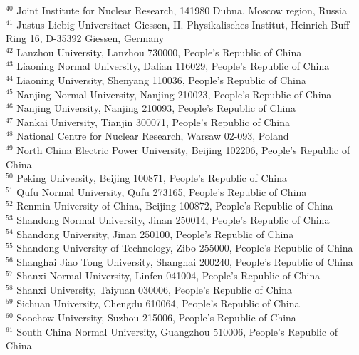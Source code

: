 \documentclass[aps,amsmath,amssymb,reprint]{revtex4-2}
\begin{document}
\begin{widetext}
\begin{center}
{$^{40}$ Joint Institute for Nuclear Research, 141980 Dubna, Moscow region, Russia\\
$^{41}$ Justus-Liebig-Universitaet Giessen, II. Physikalisches Institut, Heinrich-Buff-Ring 16, D-35392 Giessen, Germany\\
$^{42}$ Lanzhou University, Lanzhou 730000, People's Republic of China\\
$^{43}$ Liaoning Normal University, Dalian 116029, People's Republic of China\\
$^{44}$ Liaoning University, Shenyang 110036, People's Republic of China\\
$^{45}$ Nanjing Normal University, Nanjing 210023, People's Republic of China\\
$^{46}$ Nanjing University, Nanjing 210093, People's Republic of China\\
$^{47}$ Nankai University, Tianjin 300071, People's Republic of China\\
$^{48}$ National Centre for Nuclear Research, Warsaw 02-093, Poland\\
$^{49}$ North China Electric Power University, Beijing 102206, People's Republic of China\\
$^{50}$ Peking University, Beijing 100871, People's Republic of China\\
$^{51}$ Qufu Normal University, Qufu 273165, People's Republic of China\\
$^{52}$ Renmin University of China, Beijing 100872, People's Republic of China\\
$^{53}$ Shandong Normal University, Jinan 250014, People's Republic of China\\
$^{54}$ Shandong University, Jinan 250100, People's Republic of China\\
$^{55}$ Shandong University of Technology, Zibo 255000, People's Republic of China\\
$^{56}$ Shanghai Jiao Tong University, Shanghai 200240, People's Republic of China\\
$^{57}$ Shanxi Normal University, Linfen 041004, People's Republic of China\\
$^{58}$ Shanxi University, Taiyuan 030006, People's Republic of China\\
$^{59}$ Sichuan University, Chengdu 610064, People's Republic of China\\
$^{60}$ Soochow University, Suzhou 215006, People's Republic of China\\
$^{61}$ South China Normal University, Guangzhou 510006, People's Republic of China\\
}
\end{center}
\end{widetext}
\end{document}

